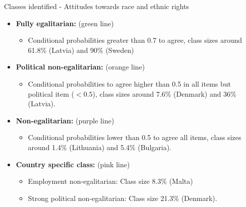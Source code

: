 \documentclass[11pt,t]{beamer}
\begin{document}
\begin{frame}[c,plain]{Classes identified - Attitudes towards race and ethnic rights}
\vspace{-5pt}

\begin{itemize}
\item \textbf{Fully egalitarian:}  (green line) 
\begin{itemize}
	\item Conditional probabilities greater than 0.7 to agree, class sizes around 61.8\% (Latvia) and 90\% (Sweden)
\end{itemize}
\vspace{5pt}
\item \textbf{Political non-egalitarian:} (orange line)

\begin{itemize}
	\item Conditional probabilities to agree higher than 0.5 in all items but political item ($< 0.5$), class sizes around 7.6\% (Denmark) and 36\% (Latvia).  
\end{itemize}

\vspace{5pt}
\item \textbf{Non-egalitarian:}  (purple line)

\begin{itemize}
	\item Conditional probabilities lower than 0.5 to agree all items, class sizes around 1.4\% (Lithuania) and 5.4\% (Bulgaria).  
\end{itemize}

\vspace{5pt}
\item \textbf{Country specific class:} (pink line)

\begin{itemize}
	\item Employment non-egalitarian: Class size 8.3\% (Malta)
	\item Strong political non-egalitarian: Class size 21.3\% (Denmark).  
\end{itemize}

\end{itemize}

\end{frame} 
\end{document}
